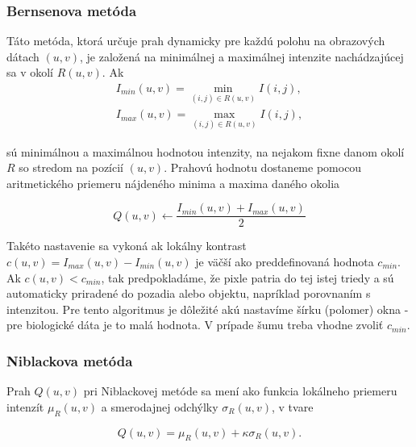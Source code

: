 \documentclass[a4paper,11pt,oneside]{article}%
\begin{document}
\subsubsection{Bernsenova metóda} \label{bernsenM}

Táto metóda, ktorá určuje prah dynamicky pre každú polohu na obrazových dátach $(u,v)$, je založená na minimálnej a maximálnej intenzite nachádzajúcej sa v okolí $R(u,v)$. Ak 
\begin{equation}
\begin{array}{l}
I_{min}(u,v) = \min\limits_{(i,j)\in R(u,v)} I(i,j),  \\
I_{max}(u,v) = \max\limits_{(i,j)\in R(u,v)} I(i,j),
\end{array}
\end{equation}

sú minimálnou a maximálnou hodnotou intenzity, na nejakom fixne danom okolí $R$ so stredom na pozícií $(u,v)$. Prahovú hodnotu dostaneme pomocou aritmetického priemeru nájdeného minima a maxima daného okolia 

\begin{equation}
Q(u,v) \gets \frac{I_{min}(u,v) + I_{max}(u,v)}{2}
\end{equation}


Takéto nastavenie sa vykoná ak lokálny kontrast $c(u, v) = I_{max}(u, v) − I_{min}(u, v)$  je väčší ako preddefinovaná hodnota $c_{min}$. Ak $c(u, v) < c_{min}$, tak predpokladáme, že pixle patria do tej istej triedy a sú automaticky priradené do pozadia alebo objektu, napríklad porovnaním s intenzitou.  Pre tento algoritmus je dôležité akú nastavíme šírku (polomer) okna - pre biologické dáta je to malá hodnota. V prípade šumu treba vhodne zvoliť  $c_{min}$.

\subsubsection{Niblackova metóda} \label{niblack} 

Prah $Q(u, v)$ pri Niblackovej metóde sa mení ako funkcia lokálneho priemeru intenzít $\mu_R(u,v)$ a smerodajnej odchýlky $\sigma_R(u,v)$, v tvare

\begin{equation} \label{eq:nbO}
Q(u,v) = \mu_R(u,v) + \kappa\sigma_R(u,v).
\end{equation}
\end{document}
